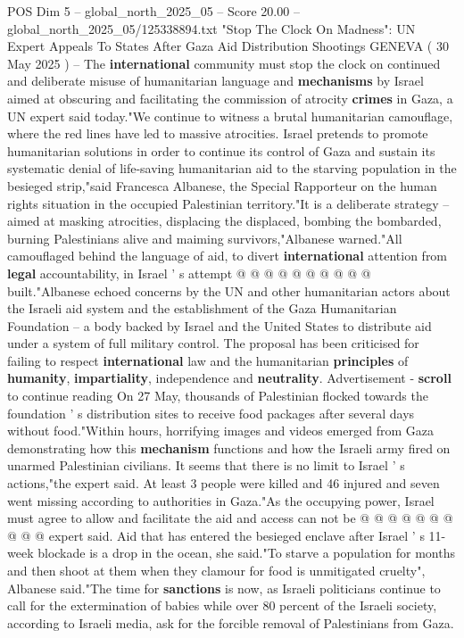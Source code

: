 \begin{textsample}{POS Dim 5 – global\_north\_2025\_05 – Score 20.00 – global\_north\_2025\_05/125338894.txt}  \label{ex:f5_pos_073}
"Stop The Clock On Madness": UN Expert Appeals To States After Gaza Aid Distribution Shootings GENEVA ( 30 May 2025 ) -- The \textbf{international} community must stop the clock on continued and deliberate misuse of humanitarian language and \textbf{mechanisms} by Israel aimed at obscuring and facilitating the commission of atrocity \textbf{crimes} in Gaza, a UN expert said today."We continue to witness a brutal humanitarian camouflage, where the red lines have led to massive atrocities.
Israel pretends to promote humanitarian solutions in order to continue its control of Gaza and sustain its systematic denial of life-saving humanitarian aid to the starving population in the besieged strip,"said Francesca Albanese, the Special Rapporteur on the human rights situation in the occupied Palestinian territory."It is a deliberate strategy -- aimed at masking atrocities, displacing the displaced, bombing the bombarded, burning Palestinians alive and maiming survivors,"Albanese warned."All camouflaged behind the language of aid, to divert \textbf{international} attention from \textbf{legal} accountability, in Israel ' s attempt @ @ @ @ @ @ @ @ @ @ built."Albanese echoed concerns by the UN and other humanitarian actors about the Israeli aid system and the establishment of the Gaza Humanitarian Foundation -- a body backed by Israel and the United States to distribute aid under a system of full military control.
The proposal has been criticised for failing to respect \textbf{international} law and the humanitarian \textbf{principles} of \textbf{humanity}, \textbf{impartiality}, independence and \textbf{neutrality}.
Advertisement - \textbf{scroll} to continue reading On 27 May, thousands of Palestinian flocked towards the foundation ' s distribution sites to receive food packages after several days without food."Within hours, horrifying images and videos emerged from Gaza demonstrating how this \textbf{mechanism} functions and how the Israeli army fired on unarmed Palestinian civilians.
It seems that there is no limit to Israel ' s actions,"the expert said.
At least 3 people were killed and 46 injured and seven went missing according to authorities in Gaza."As the occupying power, Israel must agree to allow and facilitate the aid and access can not be @ @ @ @ @ @ @ @ @ @ expert said.
Aid that has entered the besieged enclave after Israel ' s 11-week blockade is a drop in the ocean, she said."To starve a population for months and then shoot at them when they clamour for food is unmitigated cruelty", Albanese said."The time for \textbf{sanctions} is now, as Israeli politicians continue to call for the extermination of babies while over 80 percent of the Israeli society, according to Israeli media, ask for the forcible removal of Palestinians from Gaza.

\end{textsample}
